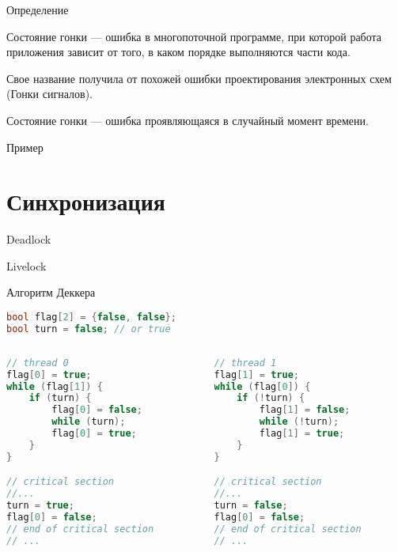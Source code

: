 \begin{frame}{Определение}

Состояние гонки --- ошибка в многопоточной программе, при которой работа приложения зависит от того, в каком порядке выполняются части кода.

Свое название получила от похожей ошибки проектирования электронных схем (Гонки сигналов).

Состояние гонки --- ошибка проявляющаяся в случайный момент времени.

\end{frame}

\begin{frame}{Пример}
\todo
\end{frame}

\section{Синхронизация}

\begin{frame}{Deadlock}
\todo
\end{frame}

\begin{frame}{Livelock}
\todo
\end{frame}

\begin{frame}[fragile]{Алгоритм Деккера}

\begin{lstlisting}[language=C++,basicstyle=\ttfamily,keywordstyle=\color{blue},basicstyle=\scriptsize]
bool flag[2] = {false, false};
bool turn = false; // or true
\end{lstlisting}

\begin{columns}[t]
    \begin{column}[T]{0.45\textwidth}
        \begin{lstlisting}[language=C++,basicstyle=\ttfamily,keywordstyle=\color{blue},basicstyle=\scriptsize]
// thread 0
flag[0] = true;
while (flag[1]) {
    if (turn) {
        flag[0] = false;
        while (turn);
        flag[0] = true;
    }
}

// critical section
//...
turn = true;
flag[0] = false;
// end of critical section
// ...
        \end{lstlisting}
    \end{column}
    \begin{column}[T]{0.45\textwidth}
        \begin{lstlisting}[language=C++,basicstyle=\ttfamily,keywordstyle=\color{blue},basicstyle=\scriptsize]
// thread 1
flag[1] = true;
while (flag[0]) {
    if (!turn) {
        flag[1] = false;
        while (!turn);
        flag[1] = true;
    }
}

// critical section
//...
turn = false;
flag[0] = false;
// end of critical section
// ...
        \end{lstlisting}
    \end{column}
\end{columns}

\end{frame}

